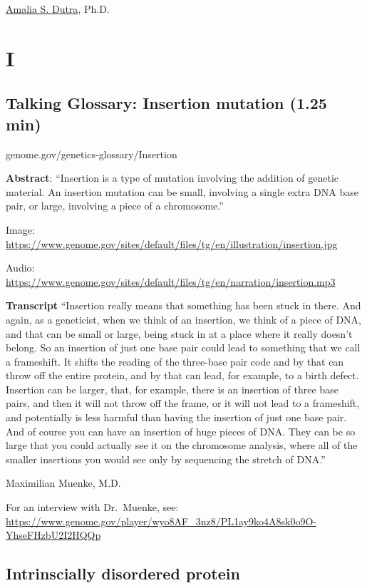 \documentclass[
]{book}
\begin{document}
\href{https://en.wikipedia.org/wiki/Amalia_Dutra}{Amalia S. Dutra}, Ph.D.

\hypertarget{i}{%
\chapter{I}\label{i}}

\hypertarget{talking-glossary-insertion-mutation-1.25-min}{%
\section{Talking Glossary: Insertion mutation (1.25 min)}\label{talking-glossary-insertion-mutation-1.25-min}}

genome.gov/genetics-glossary/Insertion

\textbf{Abstract}: ``Insertion is a type of mutation involving the addition of genetic material. An insertion mutation can be small, involving a single extra DNA base pair, or large, involving a piece of a chromosome.''

Image: \url{https://www.genome.gov/sites/default/files/tg/en/illustration/insertion.jpg}

Audio: \url{https://www.genome.gov/sites/default/files/tg/en/narration/insertion.mp3}

\textbf{Transcript} ``Insertion really means that something has been stuck in there. And again, as a geneticist, when we think of an insertion, we think of a piece of DNA, and that can be small or large, being stuck in at a place where it really doesn't belong. So an insertion of just one base pair could lead to something that we call a frameshift. It shifts the reading of the three-base pair code and by that can throw off the entire protein, and by that can lead, for example, to a birth defect. Insertion can be larger, that, for example, there is an insertion of three base pairs, and then it will not throw off the frame, or it will not lead to a frameshift, and potentially is less harmful than having the insertion of just one base pair. And of course you can have an insertion of huge pieces of DNA. They can be so large that you could actually see it on the chromosome analysis, where all of the smaller insertions you would see only by sequencing the stretch of DNA.''

Maximilian Muenke, M.D.

For an interview with Dr.~Muenke, see: \url{https://www.genome.gov/player/wyo8AF_3nz8/PL1ay9ko4A8sk0o9O-YhseFHzbU2I2HQQp}

\hypertarget{intrinscially-disordered-protein}{%
\section{Intrinscially disordered protein}\label{intrinscially-disordered-protein}}
\end{document}
